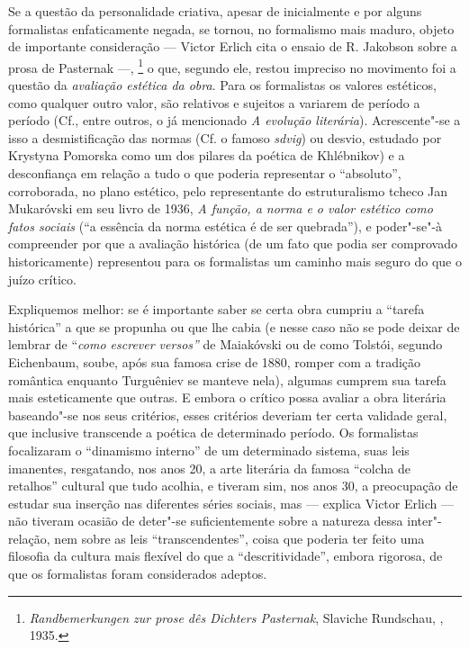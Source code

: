 Se a questão da personalidade criativa, apesar de inicialmente e por
alguns formalistas enfaticamente negada, se tornou, no formalismo mais
maduro, objeto de importante consideração --- Victor Erlich cita o ensaio
de R. Jakobson sobre a prosa de Pasternak ---, \footnote{\emph{Randbemerkungen
  zur prose dês Dichters Pasternak}, Slaviche Rundschau, , 1935.} o
que, segundo ele, restou impreciso no movimento foi a questão da
\emph{avaliação estética da obra}. Para os formalistas os valores
estéticos, como qualquer outro valor, são relativos e sujeitos a
variarem de período a período (Cf., entre outros, o já mencionado
\emph{A evolução literária}). Acrescente"-se a isso a desmistificação das
normas (Cf. o famoso \emph{sdvig}) ou desvio, estudado por Krystyna
Pomorska como um dos pilares da poética de Khlébnikov) e a desconfiança
em relação a tudo o que poderia representar o ``absoluto'', corroborada,
no plano estético, pelo representante do estruturalismo tcheco Jan
Mukaróvski em seu livro de 1936, \emph{A função, a norma e o valor
estético como fatos sociais} (``a essência da norma estética é de ser
quebrada''), e poder"-se"-à compreender por que a avaliação histórica (de
um fato que podia ser comprovado historicamente) representou para os
formalistas um caminho mais seguro do que o juízo crítico.

Expliquemos melhor: se é importante saber se certa obra cumpriu a
``tarefa histórica'' a que se propunha ou que lhe cabia (e nesse caso
não se pode deixar de lembrar de ``\emph{como escrever versos''} de
Maiakóvski ou de como Tolstói, segundo Eichenbaum, soube, após sua
famosa crise de 1880, romper com a tradição romântica enquanto
Turguêniev se manteve nela), algumas cumprem sua tarefa mais
esteticamente que outras. E embora o crítico possa avaliar a obra
literária baseando"-se nos seus critérios, esses critérios deveriam ter
certa validade geral, que inclusive transcende a poética de determinado
período. Os formalistas focalizaram o ``dinamismo interno'' de um
determinado sistema, suas leis imanentes, resgatando, nos anos 20, a
arte literária da famosa ``colcha de retalhos'' cultural que tudo
acolhia, e tiveram sim, nos anos 30, a preocupação de estudar sua
inserção nas diferentes séries sociais, mas --- explica Victor Erlich ---
não tiveram ocasião de deter"-se suficientemente sobre a natureza dessa
inter"-relação, nem sobre as leis ``transcendentes'', coisa que poderia
ter feito uma filosofia da cultura mais flexível do que a
``descritividade'', embora rigorosa, de que os formalistas foram considerados
adeptos.

